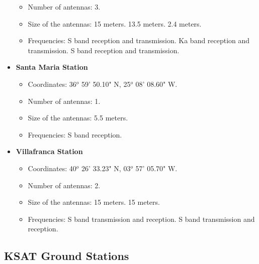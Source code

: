 \documentclass[12pt,a4paper]{report}
\begin{document}
\begin{itemize}
\begin{itemize}
\item Number of antennas: 3.
\item Size of the antennas: 15 meters. 13.5 meters. 2.4 meters.
\item Frequencies: S band reception and transmission. Ka band reception and transmission. S band reception and transmission.
\end{itemize}
\item \textbf{Santa Maria Station}
\begin{itemize}
\item Coordinates: 36$^{o}$ 59' 50.10" N, 25$^{o}$ 08' 08.60" W.
\item Number of antennas: 1.
\item Size of the antennas: 5.5 meters.
\item Frequencies: S band reception.
\end{itemize}
\item \textbf{Villafranca Station}
\begin{itemize}
\item Coordinates: 40$^{o}$ 26' 33.23" N, 03$^{o}$ 57' 05.70" W.
\item Number of antennas: 2.
\item Size of the antennas: 15 meters. 15 meters.
\item Frequencies: S band transmission and reception. S band transmission and reception.
\end{itemize}
\end{itemize}

\subsection{KSAT Ground Stations}
\end{document}
